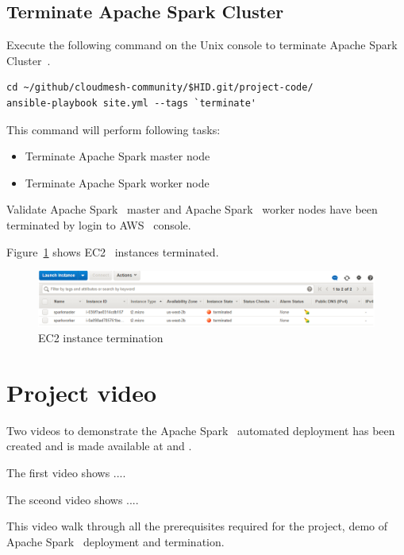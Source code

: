 \subsection{Terminate Apache Spark Cluster}

Execute the following command on the Unix console to terminate Apache
Spark Cluster~\cite{hid-sp18-511-www-spark}.

\begin{verbatim}
cd ~/github/cloudmesh-community/$HID.git/project-code/
ansible-playbook site.yml --tags `terminate'
\end{verbatim}

This command will perform following tasks:

\begin{itemize}
	\item Terminate Apache Spark master node
	\item Terminate Apache Spark worker node
\end{itemize}

Validate Apache Spark~\cite{hid-sp18-511-www-spark} master and Apache
Spark~\cite{hid-sp18-511-www-spark} worker nodes have been terminated
by login to AWS~\cite{hid-sp18-511-www-aws} console.

Figure~\ref{f:ec2-instance-terminate} shows
EC2~\cite{hid-sp18-511-www-ec2} instances terminated.

\begin{figure}[!ht]
	\centering\includegraphics[width=\columnwidth]
        {images/ec2instancesterminate.png} \caption{EC2
	instance termination}\label{f:ec2-instance-terminate}
\end{figure}


\section{Project video}

Two videos to demonstrate the Apache
Spark~\cite{hid-sp18-511-www-spark} automated deployment has been
created and is made available at \cite{??} and \cite{??}. 

The first video shows ....

The sceond video shows ....

This video
walk through all the prerequisites required for the project, demo of
Apache Spark~\cite{hid-sp18-511-www-spark} deployment and termination.

